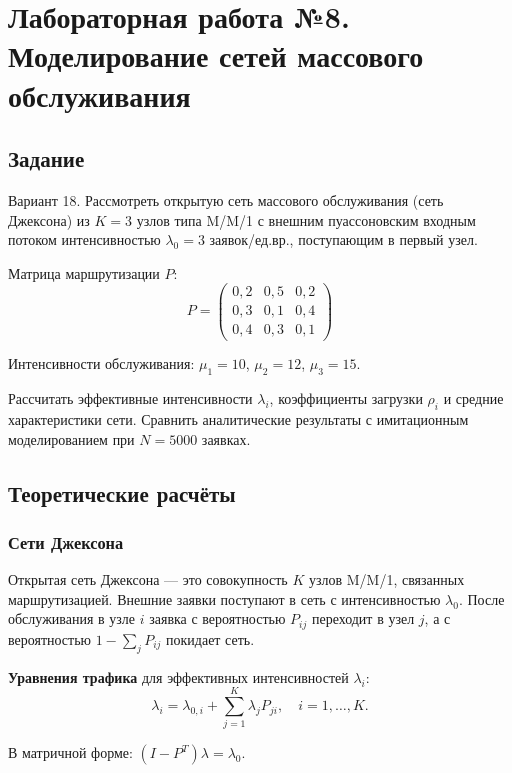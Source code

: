 \chapter{Лабораторная работа №8. Моделирование сетей массового обслуживания}
\label{ch:lab8}

\section*{Задание}
Вариант 18. Рассмотреть открытую сеть массового обслуживания (сеть Джексона) из $K = 3$ узлов типа M/M/1 с внешним пуассоновским входным потоком интенсивностью $\lambda_0 = 3$ заявок/ед.вр., поступающим в первый узел.

Матрица маршрутизации $P$:
\[
P = \begin{pmatrix}
0{,}2 & 0{,}5 & 0{,}2 \\
0{,}3 & 0{,}1 & 0{,}4 \\
0{,}4 & 0{,}3 & 0{,}1
\end{pmatrix}
\]

Интенсивности обслуживания: $\mu_1 = 10$, $\mu_2 = 12$, $\mu_3 = 15$.

Рассчитать эффективные интенсивности $\lambda_i$, коэффициенты загрузки $\rho_i$ и средние характеристики сети. Сравнить аналитические результаты с имитационным моделированием при $N = 5000$ заявках.

\section{Теоретические расчёты}

\subsection{Сети Джексона}

Открытая сеть Джексона — это совокупность $K$ узлов M/M/1, связанных маршрутизацией. Внешние заявки поступают в сеть с интенсивностью $\lambda_0$. После обслуживания в узле $i$ заявка с вероятностью $P_{ij}$ переходит в узел $j$, а с вероятностью $1 - \sum_j P_{ij}$ покидает сеть.

\textbf{Уравнения трафика} для эффективных интенсивностей $\lambda_i$:
\begin{equation}
    \lambda_i = \lambda_{0,i} + \sum_{j=1}^{K} \lambda_j P_{ji}, \quad i = 1, \dots, K.
\end{equation}

В матричной форме: $(I - P^T)\lambda = \lambda_0$.

